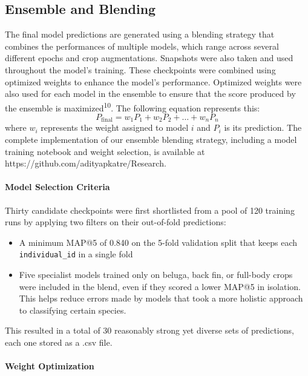 \documentclass[twocolumn]{article}
\begin{document}
\subsection{Ensemble and Blending}

The final model predictions are generated using a blending strategy that combines the performances of multiple models, which range across several different epochs and crop augmentations. Snapshots were also taken and used throughout the model's training. These checkpoints were combined using optimized weights to enhance the model's performance. Optimized weights were also used for each model in the ensemble to ensure that the score produced by the ensemble is maximized\textsuperscript{10}. The following equation represents this:
\begin{equation}
P_{\text{final}} = w_1 P_1 + w_2 P_2 + \dots + w_n P_n
\end{equation}
 where $w_i$ represents the weight assigned to model $i$ and $P_i$ is its prediction. The complete implementation of our ensemble blending strategy, including a model training notebook and weight selection, is available at https://github.com/adityapkatre/Research.

 \paragraph{Model Selection Criteria}

Thirty candidate checkpoints were first shortlisted from a pool of 120 training runs by applying two filters on their out-of-fold predictions:
\begin{itemize}
    \item A minimum MAP@5 of 0.840 on the 5-fold validation split that keeps each \texttt{individual_id} in a single fold
    \item Five specialist models trained only on beluga, back fin, or full-body crops were included in the blend, even if they scored a lower MAP@5 in isolation. This helps reduce errors made by models that took a more holistic approach to classifying certain species.
\end{itemize}

This resulted in a total of 30 reasonably strong yet diverse sets of predictions, each one stored as a .csv file.

\paragraph{Weight Optimization}
\end{document}
